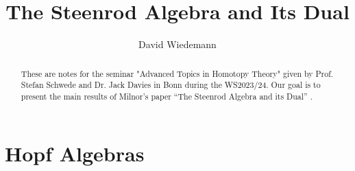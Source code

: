 \documentclass[11pt, a4paper]{article}
\theoremstyle{plain}
\begin{document}
\title{The Steenrod Algebra and Its Dual }
\author{David Wiedemann}
\maketitle
\begin{abstract}
	These are notes for the seminar "Advanced Topics in Homotopy Theory" given by Prof. Stefan Schwede and Dr. Jack Davies in Bonn during the WS2023/24. Our goal is to present the main results of Milnor's paper ``The Steenrod Algebra and its Dual'' \cite{steenrod_algebra_and_its_dual_milnor}.
\end{abstract}
\tableofcontents

\section{Hopf Algebras}
\end{document}
